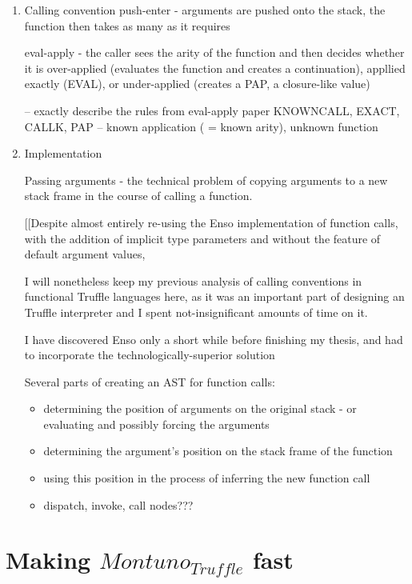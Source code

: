 \documentclass[english,zadani,odsaz]{fitthesis}
\begin{document}
\begin{enumerate}
\item Calling convention
\label{sec:org1fb300b}
push-enter - arguments are pushed onto the stack, the function then takes as
many as it requires

eval-apply - the caller sees the arity of the function and then decides whether
it is over-applied (evaluates the function and creates a continuation), appllied
exactly (EVAL), or under-applied (creates a PAP, a closure-like value)

-- exactly describe the rules from eval-apply paper KNOWNCALL, EXACT, CALLK, PAP
-- known application ( = known arity), unknown function

\item Implementation
\label{sec:org35a073e}

Passing arguments - the technical problem of copying arguments to a new stack
frame in the course of calling a function.

[[Despite almost entirely re-using the Enso implementation of function calls, with
the addition of implicit type parameters and without the feature of default
argument values,

I will nonetheless keep my previous analysis of calling conventions in
functional Truffle languages here, as it was an important part of designing an
Truffle interpreter and I spent not-insignificant amounts of time on it.

I have discovered Enso only a short while before finishing my thesis, and had to
incorporate the technologically-superior solution

Several parts of creating an AST for function calls:
\begin{itemize}
\item determining the position of arguments on the original stack - or evaluating
and possibly forcing the arguments
\item determining the argument's position on the stack frame of the function
\item using this position in the process of inferring the new function call
\item dispatch, invoke, call nodes???
\end{itemize}

\end{enumerate}

\chapter{Making \(Montuno_{Truffle}\) fast}
\label{sec:org402d286}
\end{document}

